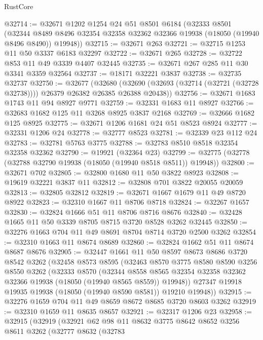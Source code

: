 \begin{lexlean}{RustCore}
\begin{coremodule}
@32714 := @32671
    @1202
    @1254
    @24
    @51
    @8501
    @6184
    (@32333
      @8501
      (@32344 @8489 @8496 @32354 @32358 @32362 @32366 @19938 (@18050 (@19940 @8496 @8490)) @19948))
@32715 := @32671 @263
@32721 := @32715 @1253 @11 @50 @3337 @6183 @32297
@32722 := @32671 @265
@32728 := @32722 @853 @11 @49 @3339 @4407 @32445
@32735 := @32671 @267 @285 @11 @30 @3341 @3359 @32564
@32737 := @18171 @32221 @3837
@32738 := @32735 @32737
@32750 := @32677
    (@32680 (@32690 (@32693 (@32714 (@32721 (@32728 @32738)))) @26379 @26382 @26385 @26388 @20438))
@32756 := @32671 @1683 @1743 @11 @94 @8927 @9771
@32759 := @32331 @1683 @11 @8927
@32766 := @32683 @1682 @125 @11 @3268 @8925 @3837 @2168
@32769 := @32666 @1682 @125 @8925
@32775 := @32671 @1206 @1681 @24 @51 @8523 @8924
@32777 := @32331 @1206 @24
@32778 := @32777 @8523
@32781 := @32339 @23 @112 @24
@32783 := @32781 @5763 @3775
@32788 := @32783 @8510 @8518 @32354 @32358 @32362
@32790 := @19921 (@32364 @23)
@32799 := @32775 (@32778 (@32788 @32790 @19938 (@18050 (@19940 @8518 @8511)) @19948))
@32800 := @32671 @702
@32805 := @32800 @1680 @11 @50 @3822 @8923
@32808 := @19619 @32221 @3837 @11
@32812 := @32808 @701 @3822 @20055 @20059
@32813 := @32805 @32812
@32819 := @32671 @1667 @1679 @11 @49 @8720 @8922
@32823 := @32310 @1667 @11 @8706 @8718
@32824 := @32267 @1657
@32830 := @32824 @1666 @51 @11 @8706 @8716 @8676
@32840 := @32428 @1665 @11 @50 @3339 @8705 @8715 @3720 @8528 @3262 @32445
@32850 := @32276 @1663 @704 @11 @49 @8691 @8704 @8714 @3720 @2500 @3262
@32854 := @32310 @1663 @11 @8674 @8689
@32860 := @32824 @1662 @51 @11 @8674 @8687 @8676
@32905 := @32447
    @1661
    @11
    @50
    @8597
    @8673
    @8686
    @3720
    @8542
    @3262
    (@32458
      @8573
      @8595
      (@32463
        @8570
        @3775
        @8580
        @8590
        @3256
        @8550
        @3262
        (@32333
          @8570
          (@32344
            @8558
            @8565
            @32354
            @32358
            @32362
            @32366
            @19938
            (@18050 (@19940 @8565 @8559))
            @19948))
        @27347
        @19918
        @19935
        @19938
        (@18050 (@19940 @8590 @8581))
        @19210
        @19948))
@32915 := @32276 @1659 @704 @11 @49 @8659 @8672 @8685 @3720 @8603 @3262
@32919 := @32310 @1659 @11 @8635 @8657
@32921 := @32317 @1206 @23
@32958 := @32915
    (@32919
      (@32921
        @62
        @98
        @11
        @8632
        @3775
        @8642
        @8652
        @3256
        @8611
        @3262
        (@32777
          @8632
          (@32783

\end{coremodule}
\end{lexlean}

